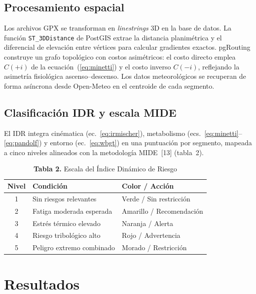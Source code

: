 \documentclass[10pt,letterpaper,twocolumn]{article}
\begin{document}
\subsection{Procesamiento espacial}

Los archivos GPX se transforman en \textit{linestrings} 3D en la base de
datos. La funci\'{o}n \texttt{ST\_3DDistance} de PostGIS extrae la
distancia planim\'{e}trica y el diferencial de elevaci\'{o}n entre
v\'{e}rtices para calcular gradientes exactos. pgRouting construye un
grafo topol\'{o}gico con costos asim\'{e}tricos: el costo directo emplea
$C({+}i)$ de la ecuaci\'{o}n~(\ref{eq:minetti}) y el costo inverso
$C({-}i)$, reflejando la asimetr\'{i}a fisiol\'{o}gica ascenso--descenso.
Los datos meteorol\'{o}gicos se recuperan de forma as\'{i}ncrona desde
Open-Meteo en el centroide de cada segmento.

\subsection{Clasificaci\'{o}n IDR y escala MIDE}

El IDR integra cin\'{e}matica (ec.~\ref{eq:irmischer}),
metabolismo (ecs.~\ref{eq:minetti}--\ref{eq:pandolf}) y entorno
(ec.~\ref{eq:wbgt}) en una puntuaci\'{o}n por segmento, mapeada a cinco
niveles alineados con la metodolog\'{i}a MIDE~[13] (tabla~2).

\begin{table}[H]
\centering
\caption{\textbf{Tabla 2.} Escala del \'{I}ndice Din\'{a}mico de Riesgo}
\label{tab:idr}
\begin{tabular}{@{}clp{2.5cm}@{}}
\toprule
\textbf{Nivel} & \textbf{Condici\'{o}n} & \textbf{Color / Acci\'{o}n} \\
\midrule
1 & Sin riesgos relevantes     & Verde / Sin restricci\'{o}n \\
2 & Fatiga moderada esperada   & Amarillo / Recomendaci\'{o}n \\
3 & Estr\'{e}s t\'{e}rmico elevado     & Naranja / Alerta \\
4 & Riesgo tribol\'{o}gico alto & Rojo / Advertencia \\
5 & Peligro extremo combinado  & Morado / Restricci\'{o}n \\
\bottomrule
\end{tabular}
\end{table}

\section{Resultados}
\end{document}
